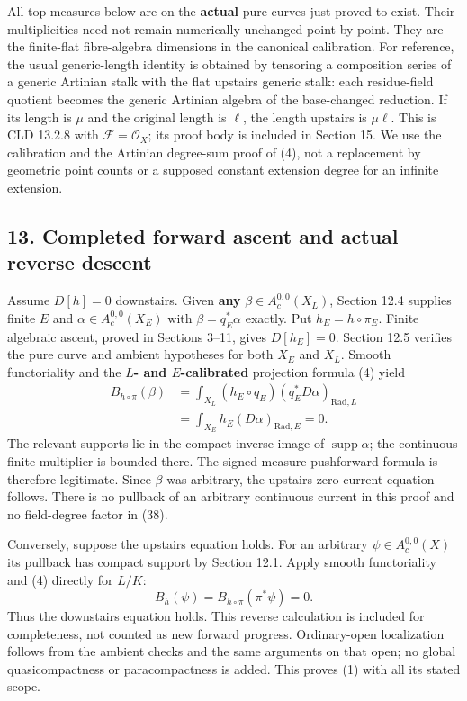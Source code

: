 \documentclass[
  11pt,
]{article}
\begin{document}
All top measures below are on the \textbf{actual} pure curves just
proved to exist. Their multiplicities need not remain numerically
unchanged point by point. They are the finite-flat fibre-algebra
dimensions in the canonical calibration. For reference, the usual
generic-length identity is obtained by tensoring a composition series of
a generic Artinian stalk with the flat upstairs generic stalk: each
residue-field quotient becomes the generic Artinian algebra of the
base-changed reduction. If its length is \(\mu\) and the original length
is \(\ell\), the length upstairs is \(\mu\ell\). This is CLD 13.2.8 with
\(\mathcal F=\mathcal O_X\); its proof body is included in Section 15.
We use the calibration and the Artinian degree-sum proof of (4), not a
replacement by geometric point counts or a supposed constant extension
degree for an infinite extension.

\subsection{13. Completed forward ascent and actual reverse
descent}\label{completed-forward-ascent-and-actual-reverse-descent}

Assume \(D[h]=0\) downstairs. Given \textbf{any}
\(\beta\in A_c^{0,0}(X_L)\), Section 12.4 supplies finite \(E\) and
\(\alpha\in A_c^{0,0}(X_E)\) with \(\beta=q_E^*\alpha\) exactly. Put
\(h_E=h\circ\pi_E\). Finite algebraic ascent, proved in Sections 3--11,
gives \(D[h_E]=0\). Section 12.5 verifies the pure curve and ambient
hypotheses for both \(X_E\) and \(X_L\). Smooth functoriality and the
\textbf{\(L\)- and \(E\)-calibrated} projection formula (4) yield \[
 \begin{aligned}
 B_{h\circ\pi}(\beta)
 &=\int_{X_L}(h_E\circ q_E)(q_E^*D\alpha)_{\mathrm{Rad},L}\\
 &=\int_{X_E}h_E(D\alpha)_{\mathrm{Rad},E}
 =0.
 \end{aligned}                                             \tag{38}
\] The relevant supports lie in the compact inverse image of
\(\operatorname{supp}\alpha\); the continuous finite multiplier is
bounded there. The signed-measure pushforward formula is therefore
legitimate. Since \(\beta\) was arbitrary, the upstairs zero-current
equation follows. There is no pullback of an arbitrary continuous
current in this proof and no field-degree factor in (38).

Conversely, suppose the upstairs equation holds. For an arbitrary
\(\psi\in A_c^{0,0}(X)\) its pullback has compact support by Section
12.1. Apply smooth functoriality and (4) directly for \(L/K\): \[
             B_h(\psi)=B_{h\circ\pi}(\pi^*\psi)=0.        \tag{39}
\] Thus the downstairs equation holds. This reverse calculation is
included for completeness, not counted as new forward progress.
Ordinary-open localization follows from the ambient checks and the same
arguments on that open; no global quasicompactness or paracompactness is
added. This proves (1) with all its stated scope.
\end{document}
